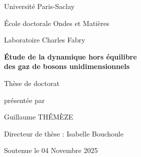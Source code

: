 








\frontmatter


\cleardoublepage
\thispagestyle{empty}
\vspace*{\fill}

\begin{titlepage}
\centering

{\Large Université Paris-Saclay\par}
\vspace{1cm}

{\large École doctorale Ondes et Matières\par}
{\large Laboratoire Charles Fabry\par}
\vspace{2cm}

{\huge\bfseries
Étude de la dynamique hors équilibre\\
des gaz de bosons unidimensionnels\par}
\vspace{2cm}

{\Large Thèse de doctorat\par}
\vspace{0.5cm}

{\large
présentée par\par
Guillaume THÉMÈZE\par}
\vspace{1.5cm}

{\large
Directeur de thèse : Isabelle Bouchoule\par}
\vspace{2cm}

{\large
Soutenue le 04 Novembre 2025 \par}

\date{\today}

\vfill
\end{titlepage}

\cleardoublepage

\printglossary[type=\acronymtype,title=Liste des acronymes]




